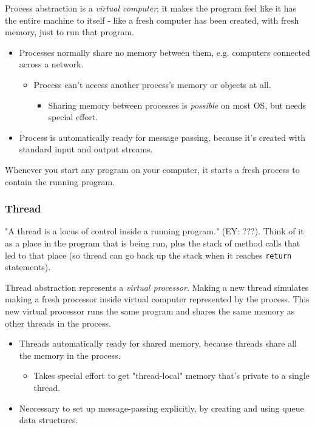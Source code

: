 \documentclass[10pt]{amsart}
\begin{document}
\begin{multicols*}{2}
Process abstraction is a \emph{virtual computer}; it makes the program feel like it has the entire machine to itself - like a fresh computer has been created, with fresh memory, just to run that program.

\begin{itemize} 
\item Processes normally share no memory between them, e.g. computers connected across a network.
\begin{itemize} 
\item Process can't access another process's memory or objects at all. \\
\begin{itemize}
	\item Sharing memory between processes is \emph{possible} on most OS, but needs special effort.
\end{itemize}
\end{itemize} 
\item Process is automatically ready for message passing, because it's created with standard input and output streams.
\end{itemize}

Whenever you start any program on your computer, it starts a fresh process to contain the running program. \\

\subsubsection{Thread}

"A thread is a locus of control inside a running program." (EY: ???). Think of it as a place in the program that is being run, plus the stack of method calls that led to that place (so thread can go back up the stack when it reaches \texttt{return} statements).

Thread abstraction represents a \emph{virtual processor}. Making a new thread simulates making a fresh processor inside virtual computer represented by the process. This new virtual processor runs the same program and shares the same memory as other threads in the process.

\begin{itemize}
	\item Threads automatically ready for shared memory, because threads share all the memory in the process.
	\begin{itemize}
		\item Takes special effort to get "thread-local" memory that's private to a single thread.		
	\end{itemize}
\item Neccessary to set up message-passing explicitly, by creating and using queue data structures.
\end{itemize}


\end{multicols*}
\end{document}
